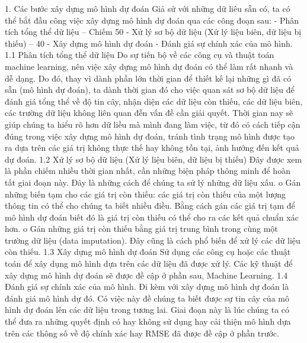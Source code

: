 1.	Các bước xây dựng mô hình dự đoán
Giả sử với những dữ liêu sẵn có, ta có thể bắt đầu công việc xây dựng mô hình dự đoán qua các công đoạn sau:
-	Phân tích tổng thể dữ liệu – Chiếm 50%
-	Xử lý sơ bộ dữ liệu (Xử lý liệu biên, dữ liệu bị thiếu) – 40%
-	Xây dựng mô hình dự đoán
-	Đánh giá sự chính xác của mô hình.
1.1	Phân tích tổng thể dữ liệu 
Do sự tiến bộ về các công cụ và thuật toán machine learning, nên việc xây dựng mô hình dự đoán có thể làm rất nhanh và dễ dạng. Do đó, thay vì dành phần lớn thời gian để thiết kế lại những gì đã có sẵn (mô hình dự đoán), ta dành thời gian đó cho việc quan sát sơ bộ dữ liệu để đánh giá tổng thể về độ tin cây, nhận diện các dữ liệu còn thiếu, các dữ liệu biên, các trường dữ liệu không liên quan đễn vấn đề cần giải quyết. Thời gian nay sẽ giúp chúng ta hiểu rõ hơn dữ liều mà mình đang làm việc, từ đó có cách tiếp cận đúng trong việc xây dựng mô hình dự đoán, tránh tình trạng mô hình được tạo ra dựa trên các giá trị không thực thế hay không tồn tại, ảnh hướng đến kết quả dự đoán.
1.2	Xử lý sơ bộ dữ liệu (Xử lý liệu biên, dữ liệu bị thiếu)
Đây được xem là phần chiếm nhiều thời gian nhất, cần những biện pháp thông minh để hoàn tất giai đoạn này. Đây là những cách để chúng ta sử lý những dữ liệu xấu.
o	Gán những biến tạm cho các giá trị còn thiếu: các giá trị còn thiếu của một  lượng thông tin có thể cho chúng ta biết nhiều điều. Bằng cách gán các giá trị tạm để mô hình dự đoán biết đó là giá trị còn thiếu có thể cho ra các kết quả chuẩn xác hơn.
o	Gán những giá trị còn thiếu bằng giá trị trung bình trong cùng một trường dữ liệu (data imputation). Đây cũng là cách phổ biến để xử lý các dữ liệu còn thiếu.
1.3	Xây dựng mô hình dự đoán
Sử dụng các công cụ hoặc các thuật toán để xây dụng mô hình dựa trên các dữ liệu đã được xử lý. Các kỹ thuật để xây dựng mô hình dự đoán sẽ được đề cập ở phần sau, Machine Learning.
1.4	Đánh giá sự chính xác của mô hình.
Đi kèm với xây dựng mô hình dự đoán là đánh giá mô hình dự đó. Có việc này đề chúng ta biết được sự tin cây của mô hình dự đoán lên các dữ liệu trong tương lai. Giai đoạn này là lúc chúng ta có thể đưa ra những quyết định có hay không sử dụng hay cải thiện mô hình dựa trên các thông số về độ chính xác hay RMSE đã được đề cập ở phần trước.
